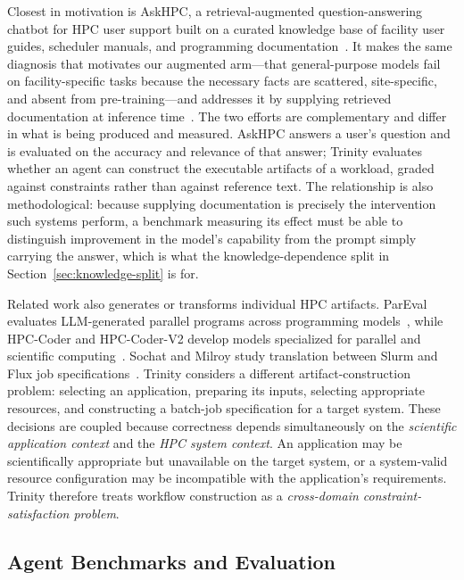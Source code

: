 \documentclass[conference]{IEEEtran}
\begin{document}
Closest in motivation is AskHPC, a retrieval-augmented question-answering chatbot for HPC user support built on a curated knowledge base of facility user guides, scheduler manuals, and programming documentation~\cite{bondapalli2025askhpc}. It makes the same diagnosis that motivates our augmented arm---that general-purpose models fail on facility-specific tasks because the necessary facts are scattered, site-specific, and absent from pre-training---and addresses it by supplying retrieved documentation at inference time~\cite{lewis2020rag}. The two efforts are complementary and differ in what is being produced and measured. AskHPC answers a user's question and is evaluated on the accuracy and relevance of that answer; Trinity evaluates whether an agent can construct the executable artifacts of a workload, graded against constraints rather than against reference text. The relationship is also methodological: because supplying documentation is precisely the intervention such systems perform, a benchmark measuring its effect must be able to distinguish improvement in the model's capability from the prompt simply carrying the answer, which is what the knowledge-dependence split in Section~\ref{sec:knowledge-split} is for.

Related work also generates or transforms individual HPC artifacts. ParEval evaluates LLM-generated parallel programs across programming models~\cite{nichols2024pareval}, while HPC-Coder and HPC-Coder-V2 develop models specialized for parallel and scientific computing~\cite{nichols2024hpccoder,chaturvedi2025hpccoderv2}. Sochat and Milroy study translation between Slurm and Flux job specifications~\cite{sochat2026descriptive}. Trinity considers a different artifact-construction problem: selecting an application, preparing its inputs, selecting appropriate resources, and constructing a batch-job specification for a target system. These decisions are coupled because correctness depends simultaneously on the \textit{scientific application context} and the \textit{HPC system context}. An application may be scientifically appropriate but unavailable on the target system, or a system-valid resource configuration may be incompatible with the application's requirements. Trinity therefore treats workflow construction as a \textit{cross-domain constraint-satisfaction problem}.

\subsection{Agent Benchmarks and Evaluation}
\end{document}
